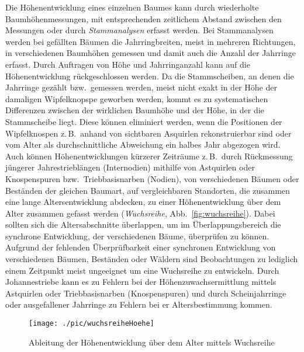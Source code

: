 \documentclass[twocolumn]{scrartcl}
\begin{document}
Die Höhenentwicklung eines einzelnen Baumes kann durch wiederholte
Baumhöhenmessungen, mit entsprechenden zeitlichem Abstand zwischen den Messungen
oder durch \emph{Stammanalysen} erfasst werden. Bei
Stammanalysen werden bei gefällten Bäumen die Jahrringbreiten, meist in mehreren
Richtungen, in verschiedenen Baumhöhen gemessen und damit auch die Anzahl der
Jahrringe erfasst. Durch Auftragen von Höhe und Jahrringanzahl kann auf die
Höhenentwicklung rückgeschlossen werden. Da die Stammscheiben, an denen die
Jahrringe gezählt bzw.\ gemessen werden, meist nicht exakt in der Höhe der
damaligen Wipfelknopspe geworben werden, kommt es zu systematischen Differenzen
zwischen der wirklichen Baumhöhe und der Höhe, in der die Stammscheibe liegt.
Diese können eliminiert werden, wenn die Positionen der Wipfelknospen z.\,B.\
anhand von sichtbaren Asquirlen rekonstruierbar sind oder vom Alter als
durchschnittliche Abweichung ein halbes Jahr abgezogen wird. Auch können
Höhenentwicklungen kürzerer Zeiträume z.\,B.\ durch Rückmessung jüngerer
Jahrestrieblängen (Internodien) mithilfe von Astquirlen oder Knospenspuren bzw.\
Triebbasisnarben (Nodien),  von verschiedenen Bäumen oder Beständen der gleichen
Baumart, auf vergleichbaren Standorten, die zusammen eine lange
Altersentwicklung abdecken, zu einer Höhenentwicklung über dem Alter zusammen
gefasst werden (\emph{Wuchsreihe}\index{Wuchsreihe}, Abb.~\ref{fig:wuchsreihe}).
Dabei sollten sich die Altersabschnitte überlappen, um im Überlappungsbereich
die synchrone Entwicklung, der verschiedenen Bäume, überprüfen zu können.
Aufgrund der fehlenden Überprüfbarkeit einer synchronen Entwicklung von
verschiedenen Bäumen, Beständen oder Wäldern sind Beobachtungen zu lediglich
einem Zeitpunkt meist ungeeignet um eine Wuchsreihe zu entwickeln. Durch
Johannestriebe kann es zu Fehlern bei der Höhenzuwachsermittlung mittels
Astquirlen oder Triebbasisnarben (Knospenspuren) und durch Scheinjahrringe oder
ausgefallener Jahrringe zu Fehlern bei er Altersbestimmung kommen.

\begin{figure}[htbp]
  \centering
  \texttt{[image: ./pic/wuchsreiheHoehe]}
  \caption{Ableitung der Höhenentwicklung über dem Alter mittels Wuchsreihe}
  \label{fig:wuchsreiheHoehe}
\end{figure}
\end{document}
